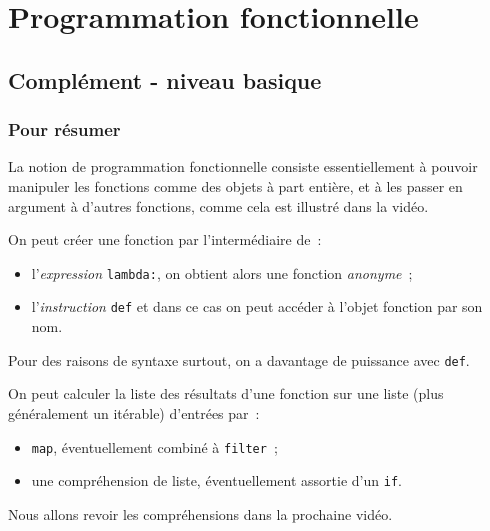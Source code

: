     
    
    
    

    

    \hypertarget{programmation-fonctionnelle}{%
\section{Programmation
fonctionnelle}\label{programmation-fonctionnelle}}

    \hypertarget{compluxe9ment---niveau-basique}{%
\subsection{Complément - niveau
basique}\label{compluxe9ment---niveau-basique}}

    \hypertarget{pour-ruxe9sumer}{%
\subsubsection{Pour résumer}\label{pour-ruxe9sumer}}

    La notion de programmation fonctionnelle consiste essentiellement à
pouvoir manipuler les fonctions comme des objets à part entière, et à
les passer en argument à d'autres fonctions, comme cela est illustré
dans la vidéo.

    On peut créer une fonction par l'intermédiaire de~:

\begin{itemize}
\tightlist
\item
  l'\emph{expression} \texttt{lambda:}, on obtient alors une fonction
  \emph{anonyme}~;
\item
  l'\emph{instruction} \texttt{def} et dans ce cas on peut accéder à
  l'objet fonction par son nom.
\end{itemize}

Pour des raisons de syntaxe surtout, on a davantage de puissance avec
\texttt{def}.

    On peut calculer la liste des résultats d'une fonction sur une liste
(plus généralement un itérable) d'entrées par~:

\begin{itemize}
\tightlist
\item
  \texttt{map}, éventuellement combiné à \texttt{filter}~;
\item
  une compréhension de liste, éventuellement assortie d'un \texttt{if}.
\end{itemize}

Nous allons revoir les compréhensions dans la prochaine vidéo.

